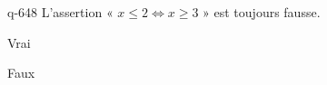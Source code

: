 \begin{truefalse}{q-648}
L'assertion « $x\leq 2 \Leftrightarrow x \geq 3$ » est toujours fausse.
\item Vrai
\item* Faux
\end{truefalse}

